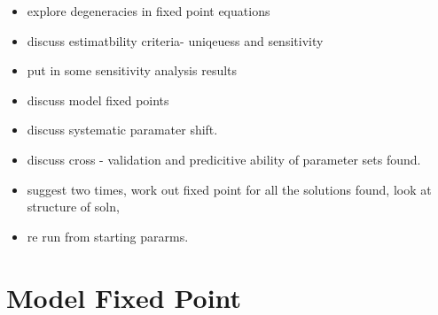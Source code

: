 \documentclass[10pt,journal]{./IEEE_latex_class/IEEEtran}
\begin{document}
  \begin{itemize}
 \item explore degeneracies in fixed point equations
 \item discuss estimatbility criteria- uniqeuess and sensitivity
 \item put in some sensitivity analysis results
 \item discuss model fixed points
 \item discuss systematic paramater shift.
 \item discuss cross - validation and predicitive ability of parameter sets found.
 \item suggest two times, work out fixed point for all the solutions found, look at structure of soln,
 \item re run from starting pararms.
 \end{itemize}

\section{Model Fixed Point}
\label{ModelFixedPoint}
\setcounter{figure}{0}   
\end{document}
